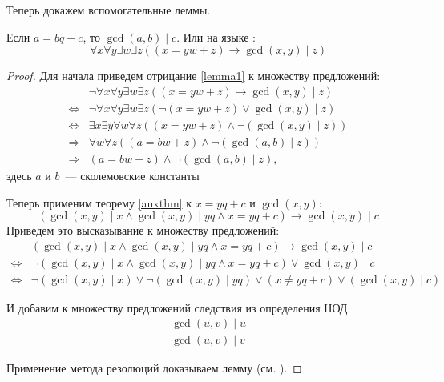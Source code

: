 \documentclass[12pt, a4paper, oneside]{memoir}
\begin{document}
Теперь докажем вспомогательные леммы.
\begin{lemma}
    Если $a = bq+c$, то $\gcd(a, b) \mid c$.
    Или на языке \FA:
    \begin{equation}
        \forall x \forall y \exists w \exists z ((x = yw + z) \rightarrow \gcd(x, y) \mid z) \label{lemma1}
    \end{equation}
\end{lemma}
\begin{proof}
    Для начала приведем отрицание \eqref{lemma1} к множеству предложений:
    \begin{align*}
                          & \lnot \forall x \forall y \exists w \exists z ((x = yw + z) \rightarrow \gcd(x, y) \mid z) \\
        \Leftrightarrow{} & \lnot \forall x \forall y \exists w \exists z (\lnot (x = yw + z) \lor \gcd(x, y) \mid z)  \\
        \Leftrightarrow{} & \exists x \exists y \forall w \forall z ((x = yw + z) \land \lnot (\gcd(x, y) \mid z))     \\
        \Rightarrow {}    & \forall w \forall z ((a = bw + z) \land \lnot (\gcd(a, b) \mid z))                         \\
        \Rightarrow{}     & (a = bw + z) \land \lnot (\gcd(a, b) \mid z),
    \end{align*}
    здесь $a$ и $b$~--- сколемовские константы

    Теперь применим теорему \ref{auxthm} к $x = yq + c$ и $\gcd(x, y)$:
    \[(\gcd(x, y) \mid x \land \gcd(x, y) \mid yq \land x = yq + c) \rightarrow \gcd(x, y) \mid c\]
    Приведем это высказывание к множеству предложений:
    \begin{align*}
                          & (\gcd(x, y) \mid x \land \gcd(x, y) \mid yq \land x = yq + c) \rightarrow \gcd(x, y) \mid c             \\
        \Leftrightarrow{} & \lnot (\gcd(x, y) \mid x \land \gcd(x, y) \mid yq \land x = yq + c) \lor \gcd(x, y) \mid c              \\
        \Leftrightarrow{} & \lnot (\gcd(x, y) \mid x) \lor \lnot (\gcd(x, y) \mid yq) \lor (x \neq yq + c) \lor (\gcd(x, y) \mid c)
    \end{align*}

    И добавим к множеству предложений следствия из определения НОД:
    \begin{gather*}
        \gcd(u, v) \mid u\\
        \gcd(u, v) \mid v
    \end{gather*}

    Применение метода резолюций доказываем лемму (см. ).
\end{proof}
\end{document}
